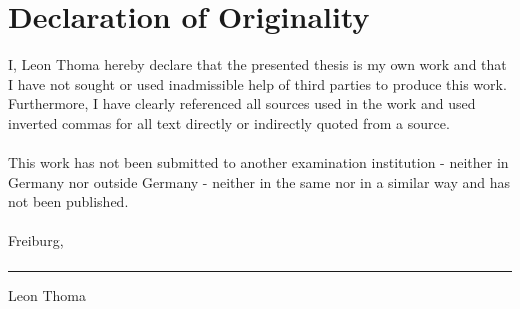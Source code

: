 \documentclass[12pt,a4paper]{article}
\begin{document}
\section*{Declaration of Originality}
I, Leon Thoma hereby declare that the presented thesis is my own work and that I have not sought or used inadmissible help of third parties to produce this work. Furthermore, I have clearly referenced all sources used in the work and used inverted commas for all text directly or indirectly quoted from a source.\paragraph{}
This work has not been submitted to another examination institution - neither in Germany nor outside Germany - neither in the same nor in a similar way and has not been published.\paragraph{}

Freiburg,\paragraph{}

\rule{5cm}{.4pt}\par
Leon Thoma
\newpage
\begin{multicols}{2}[\printbibheading]
\printbibliography[heading=none]
\end{multicols}
\end{document}
